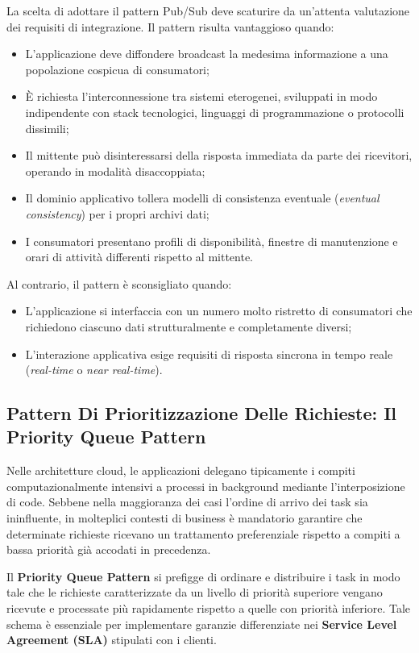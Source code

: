 \documentclass[11pt, a4paper]{article}
\begin{document}
La scelta di adottare il pattern Pub/Sub deve scaturire da un'attenta valutazione dei requisiti di integrazione. Il pattern risulta vantaggioso quando:
\begin{itemize}[noitemsep]
    \item L'applicazione deve diffondere broadcast la medesima informazione a una popolazione cospicua di consumatori;
    \item È richiesta l'interconnessione tra sistemi eterogenei, sviluppati in modo indipendente con stack tecnologici, linguaggi di programmazione o protocolli dissimili;
    \item Il mittente può disinteressarsi della risposta immediata da parte dei ricevitori, operando in modalità disaccoppiata;
    \item Il dominio applicativo tollera modelli di consistenza eventuale (\emph{eventual consistency}) per i propri archivi dati;
    \item I consumatori presentano profili di disponibilità, finestre di manutenzione e orari di attività differenti rispetto al mittente.
\end{itemize}

Al contrario, il pattern è sconsigliato quando:
\begin{itemize}[noitemsep]
    \item L'applicazione si interfaccia con un numero molto ristretto di consumatori che richiedono ciascuno dati strutturalmente e completamente diversi;
    \item L'interazione applicativa esige requisiti di risposta sincrona in tempo reale (\emph{real-time} o \emph{near real-time}).
\end{itemize}

\newpage

\subsection{Pattern Di Prioritizzazione Delle Richieste: Il Priority Queue Pattern}

Nelle architetture cloud, le applicazioni delegano tipicamente i compiti computazionalmente intensivi a processi in background mediante l'interposizione di code. Sebbene nella maggioranza dei casi l'ordine di arrivo dei task sia ininfluente, in molteplici contesti di business è mandatorio garantire che determinate richieste ricevano un trattamento preferenziale rispetto a compiti a bassa priorità già accodati in precedenza.

Il \textbf{Priority Queue Pattern} si prefigge di ordinare e distribuire i task in modo tale che le richieste caratterizzate da un livello di priorità superiore vengano ricevute e processate più rapidamente rispetto a quelle con priorità inferiore. Tale schema è essenziale per implementare garanzie differenziate nei \textbf{Service Level Agreement (SLA)} stipulati con i clienti.
\end{document}
